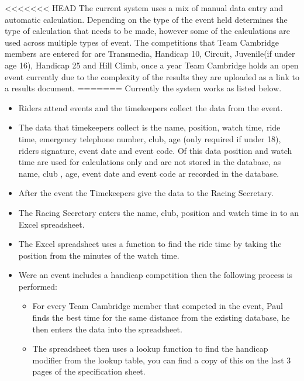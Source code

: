 <<<<<<< HEAD
The current system uses a mix of manual data entry and automatic calculation. Depending on the type of the event held determines the type of calculation that needs to be made, however some of the calculations are used across multiple types of event. The competitions that Team Cambridge members are entered for are Transmedia, Handicap 10, Circuit, Juvenile(if under age 16), Handicap 25  and Hill Climb, once a year Team Cambridge holds an open event currently due to the complexity of the results they are uploaded as a link to a results document. 
=======
Currently the system works as listed below.
\begin{itemize}
	\item Riders attend events and the timekeepers collect the data from the event.
	
	\item The data that timekeepers collect is the name, position, watch time, ride time, emergency
	 telephone number, club, age (only required if under 18), riders signature, event date and event code. Of this data position and watch time are used for calculations only and are not stored in the database, as name, club , age, event date and event code ar recorded in the database.
	 
	\item After the event the Timekeepers give the data to the Racing Secretary.
	
	\item The Racing Secretary enters the name, club, position and watch time in to an Excel spreadsheet.
	
	\item The Excel spreadsheet uses a function to find the ride time by taking the position from the minutes of the watch time.
	
	\item Were an event includes a handicap competition then the following process is performed:
	
	\begin{itemize}
	\item For every Team Cambridge member that competed in the event, Paul finds the best time for the same distance from the existing database, he then enters the data into the spreadsheet.
	
	\item The spreadsheet then uses a lookup function to find the handicap modifier from the lookup table, you can find a copy of this on the last 3 pages of the specification sheet.
	

\end{itemize}
\end{itemize}
